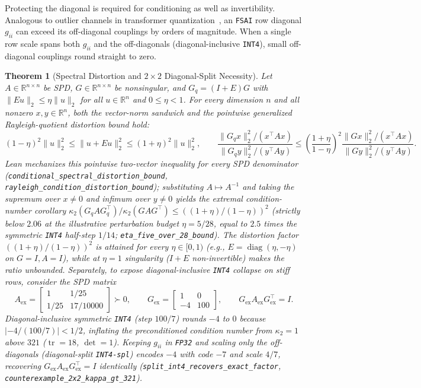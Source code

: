 \documentclass[10pt]{article}
\newtheorem{theorem}{Theorem}
\begin{document}
Protecting the diagonal is required for conditioning as well as invertibility. Analogous to outlier channels in transformer quantization~\cite{dettmers2022llmint8,dettmers2023qlora}, an \texttt{FSAI} row diagonal $g_{ii}$ can exceed its off-diagonal couplings by orders of magnitude. When a single row scale spans both $g_{ii}$ and the off-diagonals (diagonal-inclusive \texttt{INT4}), small off-diagonal couplings round straight to zero.

\begin{theorem}[Spectral Distortion and $2\times 2$ Diagonal-Split Necessity]
Let $A \in \mathbb{R}^{n \times n}$ be SPD, $G \in \mathbb{R}^{n \times n}$ be nonsingular, and $G_q = (I + E)G$ with $\|E u\|_2 \le \eta \|u\|_2$ for all $u \in \mathbb{R}^n$ and $0 \le \eta < 1$. For every dimension $n$ and all nonzero $x, y \in \mathbb{R}^n$, both the vector-norm sandwich and the pointwise generalized Rayleigh-quotient distortion bound hold:
\[
  (1 - \eta)^2 \|u\|_2^2 \le \|u + E u\|_2^2 \le (1 + \eta)^2 \|u\|_2^2, \qquad
  \frac{\|G_q x\|_2^2 / (x^\top A x)}{\|G_q y\|_2^2 / (y^\top A y)} \le \left(\frac{1+\eta}{1-\eta}\right)^2 \frac{\|G x\|_2^2 / (x^\top A x)}{\|G y\|_2^2 / (y^\top A y)}.
\]
Lean mechanizes this pointwise two-vector inequality for every SPD denominator (\texttt{conditional\_spectral\_distortion\_bound}, \texttt{rayleigh\_condition\_distortion\_bound}); substituting $A \mapsto A^{-1}$ and taking the supremum over $x \neq 0$ and infimum over $y \neq 0$ yields the extremal condition-number corollary $\kappa_2(G_q A G_q^\top)/\kappa_2(G A G^\top) \le ((1+\eta)/(1-\eta))^2$ (strictly below $2.06$ at the illustrative perturbation budget $\eta = 5/28$, equal to $2.5$ times the symmetric \texttt{INT4} half-step $1/14$; \texttt{eta\_five\_over\_28\_bound}). The distortion factor $((1+\eta)/(1-\eta))^2$ is attained for every $\eta \in [0, 1)$ (e.g., $E = \operatorname{diag}(\eta, -\eta)$ on $G = I, A = I$), while at $\eta = 1$ singularity ($I + E$ non-invertible) makes the ratio unbounded. Separately, to expose diagonal-inclusive \texttt{INT4} collapse on stiff rows, consider the SPD matrix
\[
  A_{\mathrm{ex}} = \begin{bmatrix}1 & 1/25\\ 1/25 & 17/10000\end{bmatrix} \succ 0, \qquad
  G_{\mathrm{ex}} = \begin{bmatrix}1 & 0\\ -4 & 100\end{bmatrix}, \qquad
  G_{\mathrm{ex}} A_{\mathrm{ex}} G_{\mathrm{ex}}^\top = I.
\]
Diagonal-inclusive symmetric \texttt{INT4} (step $100/7$) rounds $-4$ to $0$ because $|-4/(100/7)| < 1/2$, inflating the preconditioned condition number from $\kappa_2 = 1$ above $321$ ($\operatorname{tr} = 18$, $\det = 1$). Keeping $g_{ii}$ in \texttt{FP32} and scaling only the off-diagonals (diagonal-split \texttt{INT4-spl}) encodes $-4$ with code $-7$ and scale $4/7$, recovering $G_{\mathrm{ex}} A_{\mathrm{ex}} G_{\mathrm{ex}}^\top = I$ identically (\texttt{split\_int4\_recovers\_exact\_factor}, \texttt{counterexample\_2x2\_kappa\_gt\_321}).
\end{theorem}
\end{document}

